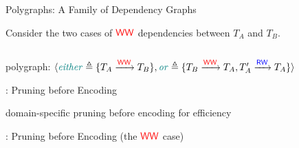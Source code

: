 \begin{frame}{Polygraphs: A Family of Dependency Graphs}
	\begin{center}
		Consider the two cases of $\textcolor{red}{\textup{\textsf{WW}}}$ dependencies between $T_{A}$ and $T_{B}$.
	\end{center}

	\vspace{-0.20cm}
	\begin{columns}[c]
	\end{columns}

	\vspace{-0.20cm}
	\begin{center}
		\pause
		polygraph:
		\pause
		$\langle\textcolor{teal}{\mathit{either}} \triangleq \{T_{A} \xrightarrow{\textcolor{red}{\textup{\textsf{WW}}}} T_{B}\},
				\textcolor{teal}{\mathit{or}} \triangleq \{T_{B} \xrightarrow{\textcolor{red}{\textup{\textsf{WW}}}} T_{A}, T_{A}' \xrightarrow{\textcolor{blue}{\textup{\textsf{RW}}}} T_{A}\}\rangle
		$
	\end{center}
\end{frame}

\begin{frame}{\polysi: Pruning before Encoding}
	\begin{center}

		\vspace{0.50cm}
		domain-specific pruning before encoding for efficiency
	\end{center}
\end{frame}

\begin{frame}{\polysi: Pruning before Encoding (the $\textcolor{red}{\textup{\textsf{WW}}}$ case)}
	\begin{columns}
		  \resizebox{1.00\textwidth}{!}{}
	\end{columns}

	\vspace{0.30cm}
  \begin{center}
  \end{center}
\end{frame}

